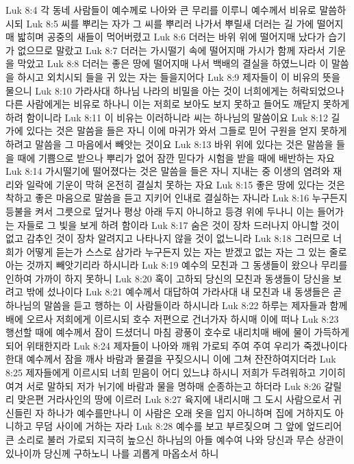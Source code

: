 Luk 8:4  각 동네 사람들이 예수께로 나아와 큰 무리를 이루니 예수께서 비유로 말씀하시되
Luk 8:5  씨를 뿌리는 자가 그 씨를 뿌리러 나가서 뿌릴새 더러는 길 가에 떨어지매 밟히며 공중의 새들이 먹어버렸고
Luk 8:6  더러는 바위 위에 떨어지매 났다가 습기가 없으므로 말랐고
Luk 8:7  더러는 가시떨기 속에 떨어지매 가시가 함께 자라서 기운을 막았고
Luk 8:8  더러는 좋은 땅에 떨어지매 나서 백배의 결실을 하였느니라 이 말씀을 하시고 외치시되 들을 귀 있는 자는 들을지어다
Luk 8:9  제자들이 이 비유의 뜻을 물으니
Luk 8:10  가라사대 하나님 나라의 비밀을 아는 것이 너희에게는 허락되었으나 다른 사람에게는 비유로 하나니 이는 저희로 보아도 보지 못하고 들어도 깨닫지 못하게 하려 함이니라
Luk 8:11  이 비유는 이러하니라 씨는 하나님의 말씀이요
Luk 8:12  길 가에 있다는 것은 말씀을 들은 자니 이에 마귀가 와서 그들로 믿어 구원을 얻지 못하게 하려고 말씀을 그 마음에서 빼앗는 것이요
Luk 8:13  바위 위에 있다는 것은 말씀을 들을 때에 기쁨으로 받으나 뿌리가 없어 잠깐 믿다가 시험을 받을 때에 배반하는 자요
Luk 8:14  가시떨기에 떨어졌다는 것은 말씀을 들은 자니 지내는 중 이생의 염려와 재리와 일락에 기운이 막혀 온전히 결실치 못하는 자요
Luk 8:15  좋은 땅에 있다는 것은 착하고 좋은 마음으로 말씀을 듣고 지키어 인내로 결실하는 자니라
Luk 8:16  누구든지 등불을 켜서 그릇으로 덮거나 평상 아래 두지 아니하고 등경 위에 두나니 이는 들어가는 자들로 그 빛을 보게 하려 함이라
Luk 8:17  숨은 것이 장차 드러나지 아니할 것이 없고 감추인 것이 장차 알려지고 나타나지 않을 것이 없느니라
Luk 8:18  그러므로 너희가 어떻게 듣는가 스스로 삼가라 누구든지 있는 자는 받겠고 없는 자는 그 있는 줄로 아는 것까지 빼앗기리라 하시니라
Luk 8:19  예수의 모친과 그 동생들이 왔으나 무리를 인하여 가까이 하지 못하니
Luk 8:20  혹이 고하되 당신의 모친과 동생들이 당신을 보려고 밖에 섰나이다
Luk 8:21  예수께서 대답하여 가라사대 내 모친과 내 동생들은 곧 하나님의 말씀을 듣고 행하는 이 사람들이라 하시니라
Luk 8:22  하루는 제자들과 함께 배에 오르사 저희에게 이르시되 호수 저편으로 건너가자 하시매 이에 떠나
Luk 8:23  행선할 때에 예수께서 잠이 드셨더니 마침 광풍이 호수로 내리치매 배에 물이 가득하게 되어 위태한지라
Luk 8:24  제자들이 나아와 깨워 가로되 주여 주여 우리가 죽겠나이다 한대 예수께서 잠을 깨사 바람과 물결을 꾸짖으시니 이에 그쳐 잔잔하여지더라
Luk 8:25  제자들에게 이르시되 너희 믿음이 어디 있느냐 하시니 저희가 두려워하고 기이히 여겨 서로 말하되 저가 뉘기에 바람과 물을 명하매 순종하는고 하더라
Luk 8:26  갈릴리 맞은편 거라사인의 땅에 이르러
Luk 8:27  육지에 내리시매 그 도시 사람으로서 귀신들린 자 하나가 예수를만나니 이 사람은 오래 옷을 입지 아니하며 집에 거하지도 아니하고 무덤 사이에 거하는 자라
Luk 8:28  예수를 보고 부르짖으며 그 앞에 엎드리어 큰 소리로 불러 가로되 지극히 높으신 하나님의 아들 예수여 나와 당신과 무슨 상관이 있나이까 당신께 구하노니 나를 괴롭게 마옵소서 하니
